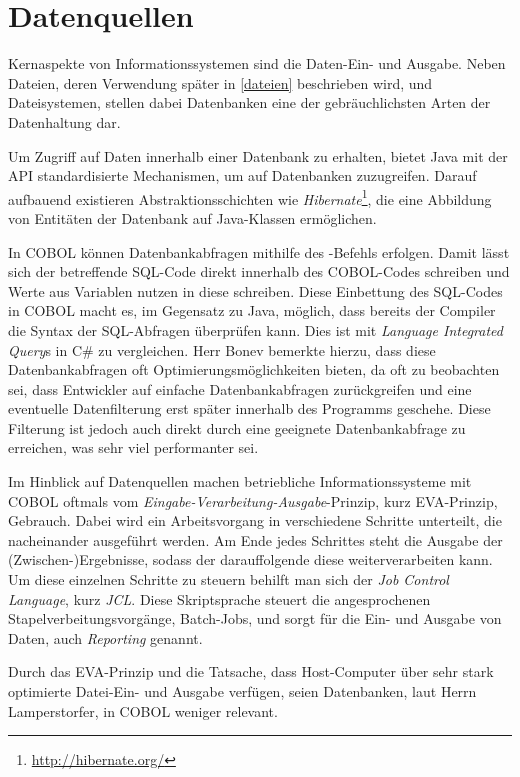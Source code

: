 \section{Datenquellen}\label{reporting}

Kernaspekte von Informationssystemen sind die Daten-Ein- und Ausgabe. Neben Dateien, deren Verwendung später in \autoref{dateien} beschrieben wird, und Dateisystemen, stellen dabei Datenbanken eine der gebräuchlichsten Arten der Datenhaltung dar.

Um Zugriff auf Daten innerhalb einer Datenbank zu erhalten, bietet Java mit der  API standardisierte Mechanismen, um auf Datenbanken zuzugreifen. Darauf aufbauend existieren Abstraktionsschichten wie \textit{Hibernate}\footnote{\url{http://hibernate.org/} \visitedOn}, die eine Abbildung von Entitäten der Datenbank auf Java-Klassen ermöglichen.

In COBOL können Datenbankabfragen mithilfe des -Befehls erfolgen. Damit lässt sich der betreffende SQL-Code direkt innerhalb des COBOL-Codes schreiben und Werte aus Variablen nutzen \bzw in diese schreiben. Diese Einbettung des SQL-Codes in COBOL macht es, im Gegensatz zu Java, möglich, dass bereits der Compiler die Syntax der SQL-Abfragen überprüfen kann. Dies ist mit \textit{Language Integrated Query}s in C\# zu vergleichen. Herr Bonev bemerkte hierzu, dass diese Datenbankabfragen oft Optimierungsmöglichkeiten bieten, da oft zu beobachten sei, dass Entwickler auf einfache Datenbankabfragen zurückgreifen und eine eventuelle Datenfilterung erst später innerhalb des Programms geschehe. Diese Filterung ist jedoch auch direkt durch eine geeignete Datenbankabfrage zu erreichen, was sehr viel performanter sei. 

Im Hinblick auf Datenquellen machen betriebliche Informationssysteme mit COBOL oftmals vom \textit{Eingabe-Verarbeitung-Ausgabe}-Prinzip, kurz EVA-Prinzip, Gebrauch. Dabei wird ein Arbeitsvorgang in verschiedene Schritte unterteilt, die nacheinander ausgeführt werden. Am Ende jedes Schrittes steht die Ausgabe der (Zwischen-)Ergebnisse, sodass der darauffolgende diese weiterverarbeiten kann. Um diese einzelnen Schritte zu steuern behilft man sich der \textit{Job Control Language}, kurz \textit{JCL}. Diese Skriptsprache steuert die angesprochenen Stapelverbeitungsvorgänge, \engl Batch-Jobs, und sorgt für die Ein- und Ausgabe von Daten, auch \textit{Reporting} genannt. 

Durch das EVA-Prinzip und die Tatsache, dass Host-Computer über sehr stark optimierte Datei-Ein- und Ausgabe verfügen, seien Datenbanken, laut Herrn Lamperstorfer, in COBOL weniger relevant.